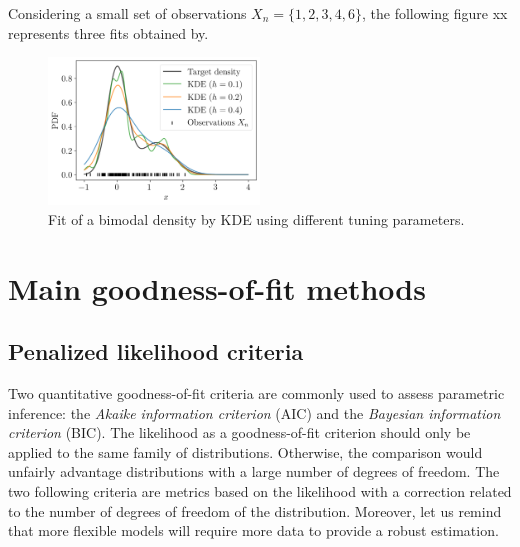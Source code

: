\begin{example}
    \label{ex:kde}
    Considering a small set of observations $X_n = \{1, 2, 3, 4, 6\}$, the following figure xx represents three fits obtained by. 
    \begin{figure}[H]
        \centering
        \includegraphics[width=0.5\textwidth]{../numerical_experiments/chapter1/figures/KDE.png}
        \caption{Fit of a bimodal density by KDE using different tuning parameters.}
        \label{fig:KDE}
    \end{figure}
\end{example}

\section*{Main goodness-of-fit methods}

\subsection*{Penalized likelihood criteria}
Two quantitative goodness-of-fit criteria are commonly used to assess parametric inference: the \textit{Akaike information criterion} (AIC) and the \textit{Bayesian information criterion} (BIC). 
The likelihood as a goodness-of-fit criterion should only be applied to the same family of distributions. 
Otherwise, the comparison would unfairly advantage distributions with a large number of degrees of freedom.
The two following criteria are metrics based on the likelihood with a correction related to the number of degrees of freedom of the distribution. 
Moreover, let us remind that more flexible models will require more data to provide a robust estimation. 

